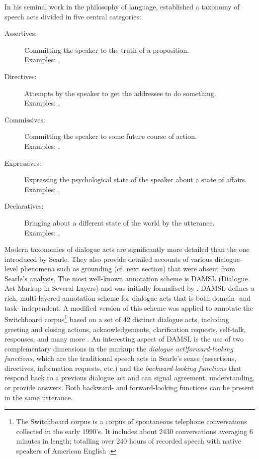 In his seminal work in the philosophy of language, \cite{searle1975taxonomy} established a taxonomy of speech acts divided in five central categories:
\begin{description}
\item[Assertives: ] Committing the speaker to the truth of a proposition. \\
Examples: , 
\item[Directives: ]  Attempts by the speaker to get the addressee to do something. \\ Examples:  , 
\item[Commissives: ] Committing the speaker to some future course of action. \\ Examples: , 
\item[Expressives: ] Expressing the psychological state of the speaker about a state of affairs. \\ Examples: , 
\item[Declaratives: ] Bringing about a different state of the world by the utterance. \\ Examples: , 
\end{description}

Modern taxonomies of dialogue acts are significantly more detailed than the one introduced by Searle.  They also provide detailed accounts of various dialogue-level phenomena such as grounding (cf. next section) that were absent from Searle's analysis. The most well-known annotation scheme is DAMSL (Dialogue Act Markup in Several Layers) and was initially formalised by \cite{Core1997}.  DAMSL defines a rich, multi-layered annotation scheme for dialogue acts that is both domain- and task- independent.  A modified version of this scheme was applied to annotate the Switchboard corpus\footnote{The Switchboard corpus is a corpus of spontaneous telephone conversations collected in the early 1990's.  It includes about 2430 conversations averaging 6 minutes in length; totalling over 240 hours of recorded speech with native speakers of American English \citep{Godfrey1992}.} based on a set of 42 distinct dialogue acts, including greeting and closing actions, acknowledgements, clarification requests, self-talk, responses, and many more \citep{Jurafsky1997}.  An interesting aspect of DAMSL is the use of two complementary dimensions in the markup: the \textit{dialogue act!forward-looking functions}, which are the traditional speech acts in Searle's sense (assertions, directives, information requests, etc.) and the \textit{backward-looking functions} that respond back to a previous dialogue act and can signal agreement, understanding, or provide answers.  Both backward- and forward-looking functions can be present in the same utterance. 

